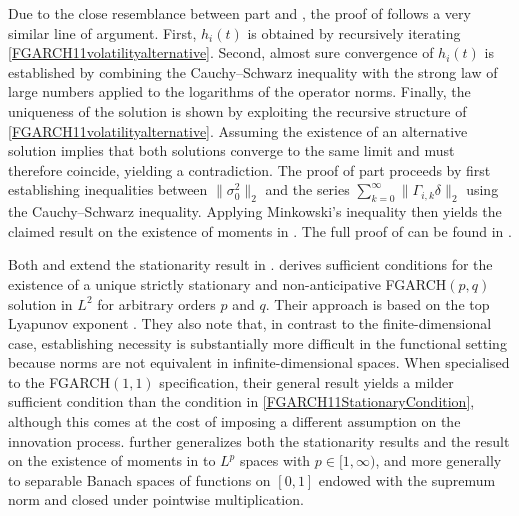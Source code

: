 \documentclass[12pt,a4paper]{article}
\theoremstyle{definition}
\begin{document}
Due to the close resemblance between  part  and , the proof of  follows a very similar line of argument. First, $h_i(t)$ is obtained by recursively iterating \cref{FGARCH11volatilityalternative}. Second, almost sure convergence of $h_i(t)$ is established by combining the Cauchy--Schwarz inequality with the strong law of large numbers applied to the logarithms of the operator norms. Finally, the uniqueness of the solution is shown by exploiting the recursive structure of \cref{FGARCH11volatilityalternative}. Assuming the existence of an alternative solution implies that both solutions converge to the same limit and must therefore coincide, yielding a contradiction. The proof of  part  proceeds by first establishing inequalities between $\|\sigma_0^2\|_2$ and the series $\sum_{k=0}^\infty \|\Gamma_{i,k}\delta\|_2$ using the Cauchy--Schwarz inequality. Applying Minkowski's inequality then yields the claimed result on the existence of moments in . The full proof of  can be found in .

Both \citet{Cerovecki2019} and \citet{Kuehnert2020} extend the stationarity result in . \citet{Cerovecki2019} derives sufficient conditions for the existence of a unique strictly stationary and non-anticipative FGARCH$(p,q)$ solution in $L^2$ for arbitrary orders $p$ and $q$. Their approach is based on the top Lyapunov exponent \citep{Kingman1973}. They also note that, in contrast to the finite-dimensional case, establishing necessity is substantially more difficult in the functional setting because norms are not equivalent in infinite-dimensional spaces. When specialised to the FGARCH$(1,1)$ specification, their general result yields a milder sufficient condition than the condition in \cref{FGARCH11StationaryCondition}, although this comes at the cost of imposing a different assumption on the innovation process. \citet{Kuehnert2020} further generalizes both the stationarity results and the result on the existence of moments in  to $L^p$ spaces with $p \in [1,\infty)$, and more generally to separable Banach spaces of functions on $[0,1]$ endowed with the supremum norm and closed under pointwise multiplication.
\end{document}
